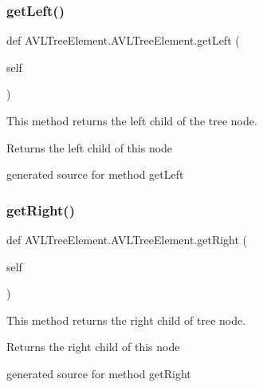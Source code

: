 \subsubsection{\texorpdfstring{get\+Left()}{getLeft()}}
{\footnotesize\ttfamily def A\+V\+L\+Tree\+Element.\+A\+V\+L\+Tree\+Element.\+get\+Left (\begin{DoxyParamCaption}\item[{}]{self }\end{DoxyParamCaption})}



This method returns the left child of the tree node. 

\begin{DoxyReturn}{Returns}
the left child of this node\begin{DoxyVerb}generated source for method getLeft \end{DoxyVerb}
 
\end{DoxyReturn}
\hypertarget{class_a_v_l_tree_element_1_1_a_v_l_tree_element_a6bd26e8d779e5f04ef41604178061d71}{}\label{class_a_v_l_tree_element_1_1_a_v_l_tree_element_a6bd26e8d779e5f04ef41604178061d71} 
\subsubsection{\texorpdfstring{get\+Right()}{getRight()}}
{\footnotesize\ttfamily def A\+V\+L\+Tree\+Element.\+A\+V\+L\+Tree\+Element.\+get\+Right (\begin{DoxyParamCaption}\item[{}]{self }\end{DoxyParamCaption})}



This method returns the right child of tree node. 

\begin{DoxyReturn}{Returns}
the right child of this node\begin{DoxyVerb}generated source for method getRight \end{DoxyVerb}
 
\end{DoxyReturn}
\hypertarget{class_a_v_l_tree_element_1_1_a_v_l_tree_element_a3bccfd80115ddc1fe76912fdcae57520}{}\label{class_a_v_l_tree_element_1_1_a_v_l_tree_element_a3bccfd80115ddc1fe76912fdcae57520} 
